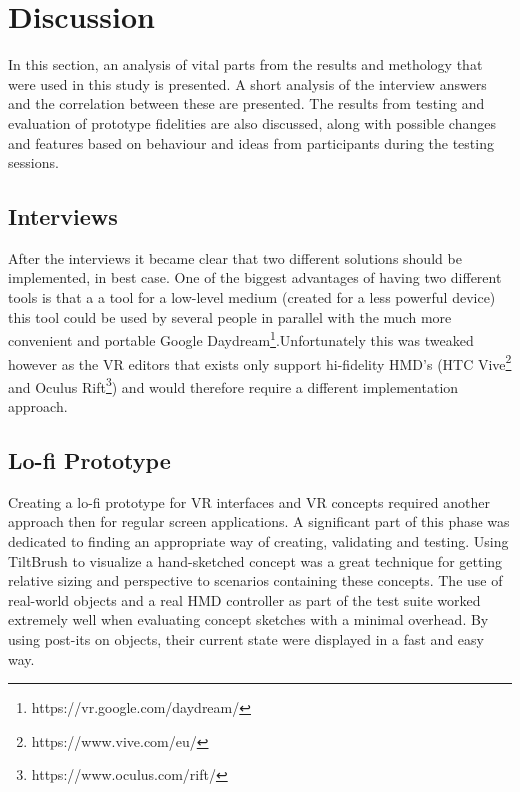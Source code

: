 
\chapter{Discussion}
\label{discussion}
In this section, an analysis of vital parts from the results and methology that were used in this study is presented. A short analysis of the interview answers and the correlation between these are presented. The results from testing and evaluation of prototype fidelities are also discussed, along with possible changes and features based on behaviour and ideas from participants during the testing sessions.

\section{Interviews}
After the interviews it became clear that two different solutions should be implemented, in best case. One of the biggest advantages of having two different tools is that a a tool for a low-level medium (created for a less powerful device) this tool could be used by several people in parallel with the much more convenient and portable Google Daydream\footnote{https://vr.google.com/daydream/}.Unfortunately this was tweaked however as the VR editors that exists only support hi-fidelity HMD's (HTC Vive\footnote{https://www.vive.com/eu/} and Oculus Rift\footnote{https://www.oculus.com/rift/}) and would therefore require a different implementation approach.

\section{Lo-fi Prototype}
Creating a lo-fi prototype for VR interfaces and VR concepts required another approach then for regular screen applications. A significant part of this phase was dedicated to finding an appropriate way of creating, validating and testing. Using TiltBrush to visualize a hand-sketched concept was a great technique for getting relative sizing and perspective to scenarios containing these concepts. The use of real-world objects and a real HMD controller as part of the test suite worked extremely well when evaluating concept sketches with a minimal overhead. By using post-its on objects, their current state were displayed in a fast and easy way.

